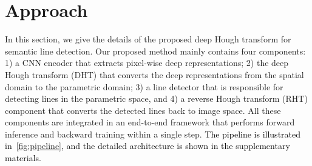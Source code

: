 \documentclass[10pt,journal,cspaper,compsoc]{IEEEtran}
\newcommand{\revise}[1]{{\textcolor{black}{#1}}}
\newcommand{\CheckRmv}[1]{}
\newcommand{\CheckRmv}[1]{#1}
\begin{document}
\section{Approach}\label{sec:dht}
In this section, we give the details of the proposed deep Hough transform for semantic line
detection.
Our proposed method mainly contains four components:
1) a CNN encoder that extracts pixel-wise deep representations;
2) the deep Hough transform (DHT) that converts the deep representations from the spatial domain to the parametric domain;
3) a line detector that is responsible for detecting lines in the parametric space, and
4) a reverse Hough transform (RHT) component that converts the detected lines back to image space.
All these components are integrated in an end-to-end framework that performs forward inference and backward training within a single step.
\revise{The pipeline is illustrated in~\cref{fig:pipeline}, and the detailed architecture is shown in the supplementary materials.}


\CheckRmv{
\begin{figure*}[tb!]
  \centering
  \begin{overpic}[scale=0.52]{figures/pipeline.pdf}
    \put(31, 28){}
    \put(54, 28){}
    \put(40.2, 13.9){}
    \put(40.2, 17.65){}
    \put(40.2, 21.45){}
    \put(40.2, 25.35){}
    \put(83.65, 11.5){}
    \put(41.7, 1){}
    \put(55.3, 1){}

    \put(67.15, 1.2){\scriptsize CTX}

    \put(64.1, 14.2){\scriptsize CTX}
    \put(64.1, 18.4){\scriptsize CTX}
    \put(64.1, 21.5){\scriptsize CTX}
    \put(64.1, 25){\scriptsize CTX}

    \put(88.6, 19){\scriptsize Loss}
    \put(85, 27){\small Training only}
    \put(93.5, 7.5){\small Testing}
    \put(94.5, 5){\small only}
    \put(5, 0.8){Upsample + Concat}
    \put(30, 0.8){Add}
    \put(47, 0.8){DHT}
    \put(60, 0.8){RHT}
    \put(72, 0.8){CTX}
  \end{overpic}
\caption{
    \revise{The pipeline of our proposed method. DHT is short for the proposed Deep Hough Transform,
    and RHT represents the Reverse Hough Transform. CTX means the context-aware line detector which contains 
    multiple convolutional layers.}
  }\label{fig:pipeline}
\end{figure*}
}
\end{document}
